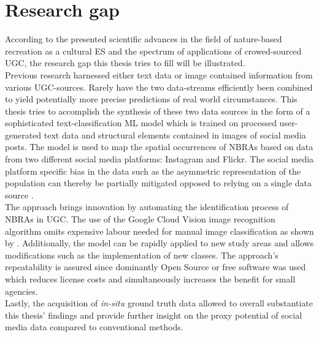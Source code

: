 \section{Research gap}
According to the presented scientific advances in the field of nature-based recreation as a cultural ES and the spectrum of applications of crowed-sourced UGC, the research gap this thesis tries to fill will be illustrated. \\

Previous research harnessed either text data \parencite{Barchiesi2015, Monkman2018, Wartmann2018} or image contained information \parencite{Richards2018, Heikinheimo2017} from various UGC-sources. Rarely have the two data-streams efficiently been combined to yield potentially more precise predictions of real world circumstances. This thesis tries to accomplish the synthesis of these two data sources in the form of a sophisticated text-classification ML model which is trained on processed user-generated text data and structural elements contained in images of social media posts. The model is used to map the spatial occurrences of NBRAs based on data from two different social media platforms: Instagram and Flickr. The social media platform specific bias in the data such as the asymmetric representation of the population can thereby be partially mitigated opposed to relying on a single data source \parencite{Barchiesi2015, Grossenbacher2014, Monkman2018, Mancini2018}. \\

The approach brings innovation by automating the identification process of NBRAs in UGC. The use of the Google Cloud Vision image recognition algorithm omits expensive labour needed for manual image classification as shown by \textcite{Richards2018}. Additionally, the model can be rapidly applied to new study areas and allows modifications such as the implementation of new classes. The approach's repeatability is assured since dominantly Open Source or free software was used which reduces license costs and simultaneously increases the benefit for small agencies. \\
Lastly, the acquisition of \textit{in-situ} ground truth data allowed to overall substantiate this thesis' findings and provide further insight on the proxy potential of social media data compared to conventional methods. 

 